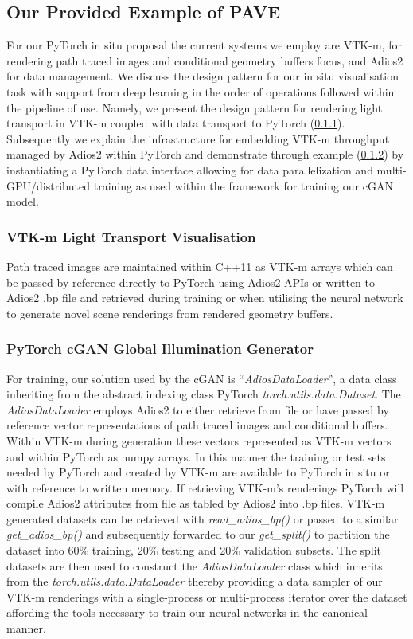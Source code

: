 \documentclass[conference]{IEEEtran}
\begin{document}
\subsection{Our Provided Example of PAVE}\label{ex}

For our PyTorch in situ proposal the current systems we employ are VTK-m, for rendering path traced images and conditional geometry buffers focus, and Adios2 for data management. We discuss the design pattern for our in situ visualisation task with support from deep learning in the order of operations followed within the pipeline of use. Namely, we present the design pattern for rendering light transport in VTK-m coupled with data transport to PyTorch (\ref{pathtracer}). Subsequently we explain the infrastructure for embedding VTK-m throughput managed by Adios2 within PyTorch and demonstrate through example (\ref{pytorch}) by  instantiating a PyTorch data interface allowing for data parallelization and multi-GPU/distributed training as used within the framework for training our cGAN model.

\subsubsection{VTK-m Light Transport Visualisation}\label{pathtracer}

Path traced images are maintained within C++11 as VTK-m arrays which can be passed by reference directly to PyTorch using Adios2 APIs or written to Adios2 .bp file and retrieved during training or when utilising the neural network to generate novel scene renderings from rendered geometry buffers. 

\subsubsection{PyTorch cGAN Global Illumination Generator}\label{pytorch}

For training, our solution used by the cGAN is ``{\it AdiosDataLoader}'', a data class inheriting from the abstract indexing class PyTorch {\it torch.utils.data.Dataset}. The {\it AdiosDataLoader} employs Adios2 to either retrieve from file or have passed by reference vector representations of path traced images and conditional buffers. Within VTK-m during generation these vectors represented as VTK-m vectors and within PyTorch as numpy arrays. In this manner the training or test sets needed by PyTorch and created by VTK-m are available to PyTorch in situ or with reference to written memory. If retrieving VTK-m's renderings PyTorch will compile Adios2 attributes from file as tabled by Adios2 into .bp files. VTK-m generated datasets can be retrieved with {\it read\_adios\_bp()} or passed to a similar {\it get\_adios\_bp()} and subsequently forwarded to our {\it get\_split()}  to partition the dataset into 60\% training, 20\% testing and 20\% validation subsets. The split datasets are then used to construct the {\it AdiosDataLoader} class which inherits from the {\it torch.utils.data.DataLoader} thereby providing a data sampler of our VTK-m renderings with a single-process or multi-process iterator over the dataset affording the tools necessary to train our neural networks in the canonical manner.
\end{document}
